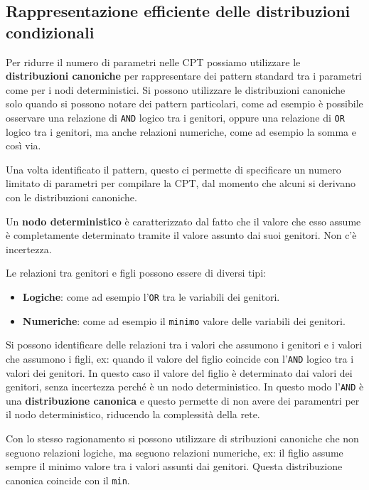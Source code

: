 \subsection{Rappresentazione efficiente delle distribuzioni condizionali}
Per ridurre il numero di parametri nelle CPT possiamo utilizzare le \textbf{distribuzioni
    canoniche} per rappresentare dei pattern standard tra i parametri come per
i nodi deterministici. Si possono utilizzare le distribuzioni canoniche solo
quando si possono notare dei pattern particolari, come ad esempio è possibile
osservare una relazione di \texttt{AND} logico tra i genitori, oppure una relazione
di \texttt{OR} logico tra i genitori, ma anche relazioni numeriche, come ad esempio
la somma e così via.

Una volta identificato il pattern, questo ci permette di specificare un numero
limitato di parametri per compilare la CPT, dal momento che alcuni si derivano
con le distribuzioni canoniche.
\begin{definizione}
    Un \textbf{nodo deterministico} è caratterizzato dal fatto che il valore che
    esso assume è completamente determinato tramite il valore assunto dai suoi
    genitori. Non c'è incertezza.
\end{definizione}
Le relazioni tra genitori e figli possono essere di diversi tipi:
\begin{itemize}
    \item \textbf{Logiche}: come ad esempio l'\texttt{OR} tra le variabili dei
          genitori.
    \item \textbf{Numeriche}: come ad esempio il \texttt{minimo} valore delle
          variabili dei genitori.
\end{itemize}

Si possono identificare delle relazioni tra i valori che assumono i genitori e 
i valori che assumono i figli, ex: quando il valore del figlio coincide con l'\texttt{AND}
logico tra i valori dei genitori. In questo caso il valore del figlio è determinato 
dai valori dei genitori, senza incertezza perché è un nodo deterministico. In questo 
modo l'\texttt{AND} è una \textbf{distribuzione canonica} e questo permette di 
non avere dei paramentri per il nodo deterministico, riducendo la complessità 
della rete. 

Con lo stesso ragionamento si possono utilizzare di stribuzioni canoniche che non 
seguono relazioni logiche, ma seguono relazioni numeriche, ex: il figlio assume 
sempre il minimo valore tra i valori assunti dai genitori.  Questa distribuzione 
canonica coincide con il \texttt{min}.

